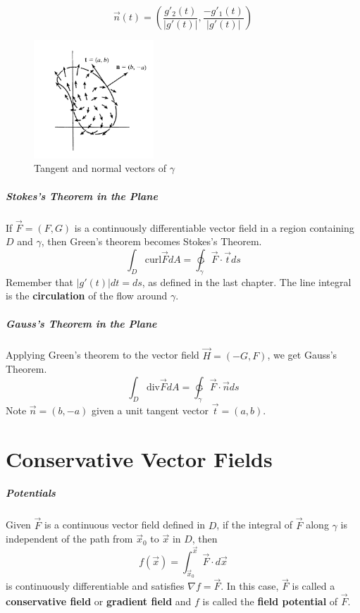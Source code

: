 \documentclass[11pt]{article}
\begin{document}
		\begin{equation}
			\vec{n}(t) = \left( \frac{g'_2(t)}{|g'(t)|}, \frac{-g'_1(t)}{|g'(t)|} \right)
		\end{equation}
		
		\begin{figure}[htb]
			\centering
			\includegraphics[width=0.4\textwidth]{greens.png}
			\caption{Tangent and normal vectors of $\gamma$}
			\label{fig:greens}
		\end{figure}
		
	\subparagraph{Stokes's Theorem in the Plane} If $\vec{F} = (F, G)$ is a continuously differentiable vector field in a region containing $D$ and $\gamma$, then Green's theorem becomes Stokes's Theorem.
		\begin{equation}
			\int_D \text{curl} \vec{F}dA = \ointctrclockwise_\gamma \vec{F} \cdot \vec{t} ds
		\end{equation}
		Remember that $|g'(t)|dt = ds$, as defined in the last chapter. The line integral is the \textbf{circulation} of the flow around $\gamma$.
		
	\subparagraph{Gauss's Theorem in the Plane} Applying Green's theorem to the vector field $\vec{H} = (-G, F)$, we get Gauss's Theorem.
		\begin{equation}
			\int_D \text{div} \vec{F} dA = \ointctrclockwise_\gamma \vec{F} \cdot \vec{n} ds
		\end{equation}
		Note $\vec{n} = (b, -a)$ given a unit tangent vector $\vec{t} = (a,b)$.
		
\section{Conservative Vector Fields}
	\subparagraph{Potentials} Given $\vec{F}$ is a continuous vector field defined in $D$, if the integral of $\vec{F}$ along $\gamma$ is independent of the path from $\vec{x}_0$ to $\vec{x}$ in $D$, then
		\[f(\vec{x}) = \int_{\vec{x}_0}^{\vec{x}} \vec{F} \cdot d\vec{x}\]
		is continuously differentiable and satisfies $\nabla f = \vec{F}$. In this case, $\vec{F}$ is called a \textbf{conservative field} or \textbf{gradient field} and $f$ is called the \textbf{field potential} of $\vec{F}$.
		
\end{document}
